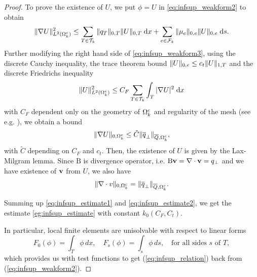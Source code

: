 {\begin{proof}
To prove the existence of $U$, we put $\phi = U$ in \eqref{eq:infsup_weakform2}
to obtain
\begin{equation} \label{eq:infsup_weakform3}
 \|\nabla U\|^2_{L^{2}(\Omega^c_k)} \leq
\sum_{T\in \mathcal{T}_k} \|q_T\|_{0,T} \|U\|_{0,T} \; \mathrm{d} x + 
\sum_{e\in \mathcal{F}_k} \|\mu_e\|_{0,e} \|U\|_{0,e} \; \mathrm{d} s.
\end{equation}
Further modifying the right hand side of \eqref{eq:infsup_weakform3}, 
using the discrete Cauchy inequality, the trace theorem bound 
$\|U\|_{0,e} \leq c_t\|U\|_{1,T}$ and the discrete Friedrichs inequality
\begin{equation*}
  \|U\|^2_{L^{2}(\Omega^c_k)} \le C_F 
\sum_{T\in\mathcal{T}_k} \int_T |\nabla U|^2 \; \mathrm{d} x
\end{equation*}
with $C_F$ dependent only on the geometry of $\Omega^c_k$ and regularity of 
the mesh (see e.g. \cite{Vohralik-2005-ODP}), we obtain a bound 
\begin{equation} \label{eq:infsup_estimate1}
\|\nabla U\|_{0,\Omega^c_k} \leq \tilde C \|\overline q_\bot\|_{\overline Q, \Omega^c_k},
\end{equation}
with $\tilde C$ depending on $C_F$ and $c_t$. Then, the existence  of $U$ 
is given by the Lax-Milgram lemma.
Since $\mathrm{B}$ is divergence operator, i.e. $\mathrm{B} \mathbf{v} = \nabla\cdot\mathbf{v}= q_\bot$ 
and we have existence of $\mathbf{v}$ from $U$, we also have
\begin{equation} \label{eq:infsup_estimate2}
\|\nabla\cdot v\|_{0,\Omega^c_k} = \|\overline q_\bot\|_{\overline Q,\Omega^c_k}.
\end{equation}

Summing up \eqref{eq:infsup_estimate1} and \eqref{eq:infsup_estimate2}, we
get the estimate \eqref{eg:infsup_estimate} with constant $k_0(C_F,C_t)$.




In particular, local finite elements are unisolvable with respect to linear 
forms
\begin{equation*}
  F_0(\phi)=\int_T \phi\, dx,\quad F_s(\phi) = \int_{s} \phi\, ds,\quad 
\text{for all sides $s$ of $T$},
\end{equation*}
which provides us with test functions to get (\ref{eq:infsup_relation}) back 
from (\ref{eq:infsup_weakform2}). 
\end{proof}
}

